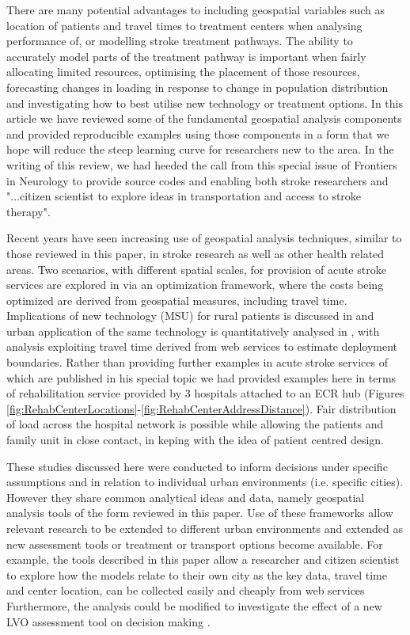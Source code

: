 \documentclass[utf8]{frontiersHLTH}
\begin{document}
There are many potential advantages to including geospatial variables
such as location of patients and travel times to treatment centers
when analysing performance of, or modelling stroke treatment
pathways. The ability to accurately model parts of the treatment
pathway is important when fairly allocating limited resources,
optimising the placement of those resources, forecasting changes in
loading in response to change in population distribution and
investigating how to best utilise new technology or treatment
options. In this article we have reviewed some of the fundamental
geospatial analysis components and provided reproducible examples
using those components in a form that we hope will reduce the steep
learning curve for researchers new to the area. In the writing of this
review, we had heeded the call from this special issue of Frontiers in
Neurology to provide source codes and enabling both stroke researchers
and "...citizen scientist to explore ideas in transportation and
access to stroke therapy".

Recent years have seen increasing use of geospatial analysis
techniques, similar to those reviewed in this paper, in stroke
research as well as other health related areas. Two scenarios, with
different spatial scales, for provision of acute stroke services are
explored in \cite{10.3389/fneur.2019.00150} via an optimization
framework, where the costs being optimized are derived from geospatial
measures, including travel time. Implications of new technology (MSU)
for rural patients is discussed in \cite{10.3389/fneur.2019.00159} and
urban application of the same technology is quantitatively analysed in
\cite{10.3389/fneur.2019.00331}, with analysis exploiting travel time
derived from web services to estimate deployment boundaries.  Rather
than providing further examples in acute stroke services of which are
published in his special topic \cite{10.3389/fneur.2019.00150,
  10.3389/fneur.2019.00159, 10.3389/fneur.2019.00331} we had provided
examples here in terms of rehabilitation service provided by 3
hospitals attached to an ECR hub (Figures
\ref{fig:RehabCenterLocations}-\ref{fig:RehabCenterAddressDistance}). Fair
distribution of load across the hospital network is possible while
allowing the patients and family unit in close contact, in keping with
the idea of patient centred design.


These studies discussed here were conducted to inform decisions under specific
assumptions and in relation to individual urban environments
(i.e. specific cities). However they share common analytical ideas and
data, namely geospatial analysis tools of the form reviewed in this
paper. Use of these frameworks allow relevant research to be extended
to different urban environments and extended as new assessment tools
or treatment or transport options become available. For example, the
tools described in this paper allow a researcher and citizen scientist to explore how the
models relate to their own city as the key data, travel time and center
location, can be collected easily and cheaply from web
services \cite{10.1001/jamaneurol.2018.2424,Milne_2017}
Furthermore, the analysis could be modified to investigate
the effect of a new LVO assessment tool on decision making
\cite{10.3389/fneur.2019.00130}.
\end{document}
